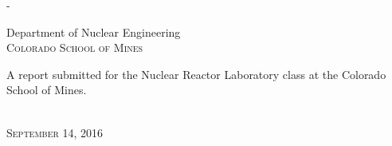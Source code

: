 \begin{titlingpage}
\begin{SingleSpace}
\begin{adjustwidth*}{\unitlength}{-\unitlength}
\begin{center}
\vspace{6mm}
{\large Department of Nuclear Engineering\\
\textsc{Colorado School of Mines}}\\
\vspace{11mm}
\begin{minipage}{10cm}
A report submitted for the Nuclear Reactor Laboratory class at the Colorado School of Mines.
\end{minipage}\\
\vspace{9mm}
{\large\textsc{September 14, 2016}}
\vspace{12mm}
\end{center}
\end{adjustwidth*}
\end{SingleSpace}
\end{titlingpage}
